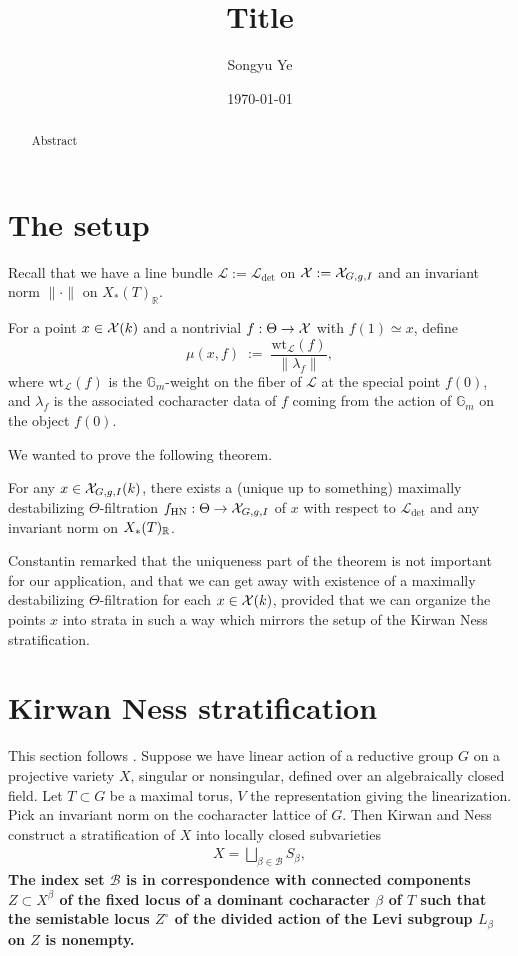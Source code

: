 \documentclass[12pt]{article}
\begin{document}
\rhead{\today}
\cfoot{\thepage}

\title{Title}
\author{Songyu Ye}
\date{\today}
\maketitle

\begin{abstract}
    Abstract
\end{abstract}

\tableofcontents

\section{The setup}
Recall that we have a line bundle $\mathcal L:=\mathcal L_{\det}$ on ${\mathcal{X}}:={\mathcal{X}}_{G,g,I}$ and an invariant norm $\|\cdot\|$ on $X_*(T)_\mathbb R$.

For a point $x\in {\mathcal{X}}(k)$ and a nontrivial $f:\Theta\to {\mathcal{X}}$ with $f(1)\simeq x$, define
$$\mu(x,f)\;:=\;\frac{\mathrm{wt}_{\mathcal L}(f)}{\|\lambda_f\|},$$
where $\mathrm{wt}_{\mathcal L}(f)$ is the $\mathbb G_m$-weight on the fiber of $\mathcal L$ at the special point $f(0)$, and $\lambda_f$ is the associated cocharacter data of $f$ coming from the action of $\mathbb G_m$ on the object $f(0)$.

We wanted to prove the following theorem.
\begin{theorem}
    For any $x\in {\mathcal{X}}_{G,g,I}(k)$, there exists a (unique up to something) maximally destabilizing $\Theta$-filtration $f_{\mathrm{HN}}:\Theta\to {\mathcal{X}}_{G,g,I}$ of $x$ with respect to $\mathcal L_{\det}$ and any invariant norm on $X_*(T)_{\mathbb{R}}$.
\end{theorem}

Constantin remarked that the uniqueness part of the theorem is not important for our application, and that we can get away with existence of a maximally destabilizing $\Theta$-filtration for each $x\in {\mathcal{X}}(k)$, provided that we can organize the points $x$ into strata in such a way which mirrors the setup of the Kirwan Ness stratification.

\section{Kirwan Ness stratification}
This section follows \cite{kirwan}.
Suppose we have linear action of a reductive group $G$
on a projective variety $X$, singular or nonsingular, defined over an algebraically closed field. Let $T \subset G$ be a maximal torus, $V$ the representation giving the linearization.
Pick an invariant norm on the cocharacter lattice of $G$. Then Kirwan and Ness construct a stratification of $X$ into locally closed subvarieties \begin{align*}
    X = \bigsqcup_{\beta \in \mathcal B} S_\beta,
\end{align*} \textbf{The index set $\mathcal B$ is in correspondence with connected components $Z \subset X^{\beta}$ of the fixed locus of a dominant cocharacter $\beta$ of $T$ such that the semistable locus $Z^\circ$ of the divided action of the Levi subgroup $L_\beta$ on $Z$ is nonempty.}
\end{document}
